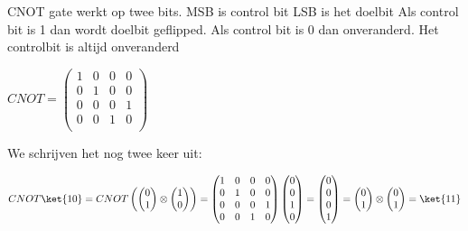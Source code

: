 CNOT gate werkt op twee bits. MSB is control bit LSB is het doelbit
Als control bit is 1 dan wordt doelbit geflipped. Als control bit is 0 dan onveranderd. Het controlbit is altijd onveranderd

$CNOT = 
\begin{pmatrix}
1&0&0&0\\
0&1&0&0\\
0&0&0&1\\
0&0&1&0\\
\end{pmatrix}
$

We schrijven het nog twee keer uit:

$
CNOT\ket{10}=CNOT
\begin{pmatrix}
\begin{pmatrix}
0\\
1
\end{pmatrix}
\otimes
\begin{pmatrix}
1\\
0
\end{pmatrix}
\end{pmatrix}
=
\begin{pmatrix}
1&0&0&0\\
0&1&0&0\\
0&0&0&1\\
0&0&1&0\\
\end{pmatrix}
\begin{pmatrix}
0\\
0\\
1\\
0
\end{pmatrix}
=
\begin{pmatrix}
0\\
0\\
0\\
1
\end{pmatrix}
=
\begin{pmatrix}
0\\
1
\end{pmatrix}
\otimes
\begin{pmatrix}
0\\
1
\end{pmatrix}
=
\ket{11}
$

